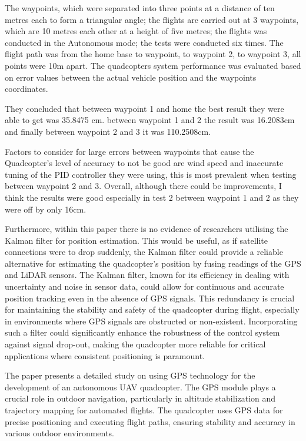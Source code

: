 \documentclass{report}
\begin{document}
The waypoints, which were separated into three points at a distance of ten
metres each to form a triangular angle; the flights are carried out at 3
waypoints, which are 10 metres each other at a height of five metres; the
flights was conducted in the Autonomous mode; the tests were conducted six
times. The flight path was from the home base to waypoint, to waypoint 2, to
waypoint 3, all points were 10m apart. The quadcopters system performance was
evaluated based on error values between the actual vehicle position and the
waypoints coordinates.

They concluded that between waypoint 1 and home the best result they were able
to get was 35.8475 cm. between waypoint 1 and 2 the result was 16.2083cm and
finally between waypoint 2 and 3 it was 110.2508cm.

Factors to consider for large errors between waypoints that cause the
Quadcopter's level of accuracy to not be good are wind speed and inaccurate
tuning of the PID controller they were using, this is most prevalent when
testing between waypoint 2 and 3. Overall, although there could be improvements,
I think the results were good especially in test 2 between waypoint 1 and 2 as
they were off by only 16cm.

Furthermore, within this paper there is no evidence of researchers utilising the Kalman filter for position estimation. This would be useful, as if satellite connections were to drop suddenly, the Kalman filter could provide a reliable alternative for estimating the quadcopter's position by fusing readings of the GPS and LiDAR sensors. The Kalman filter, known for its efficiency in dealing with uncertainty and noise in sensor data, could allow for continuous and accurate position tracking even in the absence of GPS signals. This redundancy is crucial for maintaining the stability and safety of the quadcopter during flight, especially in environments where GPS signals are obstructed or non-existent. Incorporating such a filter could significantly enhance the robustness of the control system against signal drop-out, making the quadcopter more reliable for critical applications where consistent positioning is paramount.

The paper presents a detailed study on using GPS technology for the development
of an autonomous UAV quadcopter. The GPS module plays a crucial role in outdoor
navigation, particularly in altitude stabilization and trajectory mapping for
automated flights. The quadcopter uses GPS data for precise positioning and
executing flight paths, ensuring stability and accuracy in various outdoor
environments.
\end{document}
